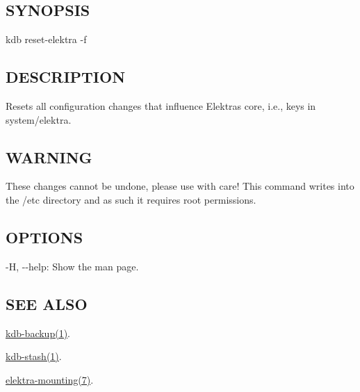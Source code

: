 \subsection*{S\+Y\+N\+O\+P\+S\+IS}

{\ttfamily kdb reset-\/elektra -\/f}

\subsection*{D\+E\+S\+C\+R\+I\+P\+T\+I\+ON}

Resets all configuration changes that influence Elektra\textquotesingle{}s core, i.\+e., keys in {\ttfamily system/elektra}.

\subsection*{W\+A\+R\+N\+I\+NG}

These changes cannot be undone, please use with care! This command writes into the {\ttfamily /etc} directory and as such it requires root permissions.

\subsection*{O\+P\+T\+I\+O\+NS}


\begin{DoxyItemize}
\item {\ttfamily -\/H}, {\ttfamily -\/-\/help}\+: Show the man page.
\end{DoxyItemize}

\subsection*{S\+EE A\+L\+SO}


\begin{DoxyItemize}
\item \hyperlink{doc_help_kdb-backup_md}{kdb-\/backup(1)}.
\item \hyperlink{doc_help_kdb-stash_md}{kdb-\/stash(1)}.
\item \hyperlink{doc_help_elektra-mounting_md}{elektra-\/mounting(7)}. 
\end{DoxyItemize}